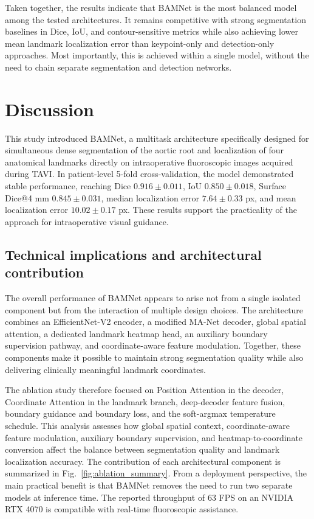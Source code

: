 \documentclass[preprint,12pt,authoryear]{elsarticle}
\begin{document}
Taken together, the results indicate that BAMNet is the most balanced model among the tested architectures. It remains competitive with strong segmentation baselines in Dice, IoU, and contour-sensitive metrics while also achieving lower mean landmark localization error than keypoint-only and detection-only approaches. Most importantly, this is achieved within a single model, without the need to chain separate segmentation and detection networks.

\section{Discussion}

This study introduced BAMNet, a multitask architecture specifically designed for simultaneous dense segmentation of the aortic root and localization of four anatomical landmarks directly on intraoperative fluoroscopic images acquired during TAVI. In patient-level 5-fold cross-validation, the model demonstrated stable performance, reaching Dice $0.916 \pm 0.011$, IoU $0.850 \pm 0.018$, Surface Dice@4 mm $0.845 \pm 0.031$, median localization error $7.64 \pm 0.33$ px, and mean localization error $10.02 \pm 0.17$ px. These results support the practicality of the approach for intraoperative visual guidance.

\subsection{Technical implications and architectural contribution}

The overall performance of BAMNet appears to arise not from a single isolated component but from the interaction of multiple design choices. The architecture combines an EfficientNet-V2 encoder, a modified MA-Net decoder, global spatial attention, a dedicated landmark heatmap head, an auxiliary boundary supervision pathway, and coordinate-aware feature modulation. Together, these components make it possible to maintain strong segmentation quality while also delivering clinically meaningful landmark coordinates.

The ablation study therefore focused on Position Attention in the decoder, Coordinate Attention in the landmark branch, deep-decoder feature fusion, boundary guidance and boundary loss, and the soft-argmax temperature schedule. This analysis assesses how global spatial context, coordinate-aware feature modulation, auxiliary boundary supervision, and heatmap-to-coordinate conversion affect the balance between segmentation quality and landmark localization accuracy. The contribution of each architectural component is summarized in Fig.~\ref{fig:ablation_summary}. From a deployment perspective, the main practical benefit is that BAMNet removes the need to run two separate models at inference time. The reported throughput of 63 FPS on an NVIDIA RTX 4070 is compatible with real-time fluoroscopic assistance.
\end{document}
